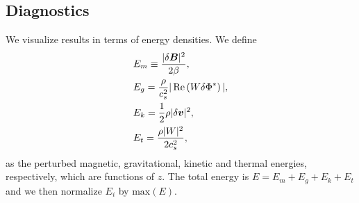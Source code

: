 \subsection{Diagnostics}
We visualize results in terms of energy densities. We define
\begin{align}
  &E_m \equiv \frac{|\delta \bm{B}|^2}{2\beta},\\
  &E_g = \frac{\rho}{c_s^2}|\operatorname{Re}\left(W\delta \Phi^*\right)|,\\
  &E_k = \frac{1}{2}\rho|\delta\bm{v}|^2,\\
  &E_t = \frac{\rho|W|^2}{2c_s^2},
\end{align}
as the perturbed magnetic, gravitational, kinetic and thermal
energies, respectively, which are functions of $z$. The total energy
is $E=E_m+E_g+E_k+E_t$ and we then normalize $E_i$ by
$\mathrm{max}(E)$.  
 
